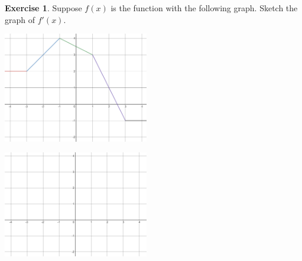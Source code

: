 \documentclass[11pt,reqno,final]{amsart}
\numberwithin{figure}{section}
\theoremstyle{definition} %
\newtheorem{exercise}[question]{Exercise}
\begin{document}
\begin{exercise}
        Suppose $f(x)$ is the function with the following graph.
        Sketch the graph of $f'(x)$.
        \begin{minipage}{0.5\textwidth}
                \begin{center}
                        \includegraphics[width=2.5in]{10-07P_f.png}
                \end{center}
        \end{minipage}
        \begin{minipage}{0.5\textwidth}
                \begin{center}
                        \includegraphics[width=2.5in]{10-07P_axes.png}
                \end{center}
        \end{minipage}
        
\end{exercise}
\end{document}

